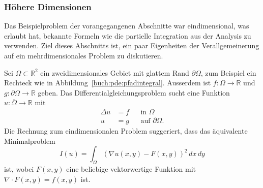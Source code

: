 \subsubsection{Höhere Dimensionen}
Das Beispielproblem der vorangegangenen Abschnitte war eindimensional,
was erlaubt hat, bekannte Formeln wie die partielle Integration aus der
Analysis zu verwenden.
Ziel dieses Abschnitts ist, ein paar Eigenheiten der Verallgemeinerung
auf ein mehrdimensionales Problem zu diskutieren.

Sei $\Omega\subset\mathbb R^2$ ein zweidimensionales Gebiet mit glattem
Rand $\partial \Omega$,
zum Beispiel ein Rechteck wie in Abbildung~\ref{buch:pde:pfadintegral}.
Ausserdem ist $f\colon\Omega\to\mathbb R$ und
$g\colon\partial\Omega\to\mathbb R$ geben.
Das Differentialgleichungsproblem sucht
eine Funktion $u\colon\overline{\Omega}\to\mathbb R$ mit
\begin{equation}
\begin{aligned}
\Delta u&=f &&\text{in $\Omega$}
\\
u&=g&&\text{auf $\partial\Omega$}.
\end{aligned}
\label{buch:pde:eqn:dgl2d}
\end{equation}
Die Rechnung zum eindimensionalen Problem suggeriert, dass 
das äquivalente Minimalproblem 
\begin{equation}
I(u)
=
\int_{\Omega} (\nabla u(x,y) - F(x,y))^2\,dx\,dy
\label{buch:pde:eqn:minimal2d}
\end{equation}
ist, wobei $F(x,y)$ eine beliebige vektorwertige Funktion mit
$\nabla\cdot F(x,y) = f(x,y)$ ist.

